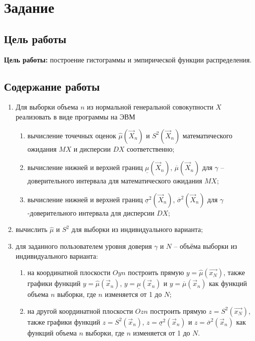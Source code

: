 \chapter{Задание}
\section{Цель работы}
\textbf{Цель работы:} построение гистограммы и эмпирической функции распределения.
\section{Содержание работы}
\begin{enumerate}
	\item Для выборки объема $n$ из нормальной генеральной совокупности $X$ реализовать в виде программы на ЭВМ
	\begin{enumerate}[label=\alph*)]
		\item вычисление точечных оценок $\hat\mu(\vec X_n)$ и $S^2(\vec X_n)$ математического ожидания $MX$ и дисперсии $DX$ соответственно;
		\item вычисление нижней и верхней границ $\underline\mu(\vec X_n)$, $\overline\mu(\vec X_n)$ для $\gamma$ -- доверительного интервала для математического ожидания $MX$;
		\item вычисление нижней и верхней границ $\underline\sigma^2(\vec X_n)$, $\overline\sigma^2(\vec X_n)$ для $\gamma$-доверительного интервала для дисперсии $DX$;
	\end{enumerate}
	\item вычислить $\hat\mu$ и $S^2$ для выборки из индивидуального варианта;
	\item для заданного пользователем уровня доверия $\gamma$ и $N$ – объёма выборки из индивидуального варианта:
	\begin{enumerate}[label=\alph*)]
		\item на координатной плоскости $Oyn$ построить прямую $y = \hat\mu(\vec{x_N})$, также графики функций $y = \hat\mu(\vec x_n)$, $y = \underline\mu(\vec x_n)$ и $y = \overline\mu(\vec x_n)$ как функций объема $n$ выборки, где $n$ изменяется от 1 до $N$;
		\item на другой координатной плоскости $Ozn$ построить прямую $z = S^2(\vec{x_N})$, также графики функций $z = S^2(\vec x_n)$, $z = \underline\sigma^2(\vec x_n)$ и $z = \overline\sigma^2(\vec x_n)$ как функций объема $n$ выборки, где $n$ изменяется от 1 до $N$.
	\end{enumerate}
\end{enumerate}

